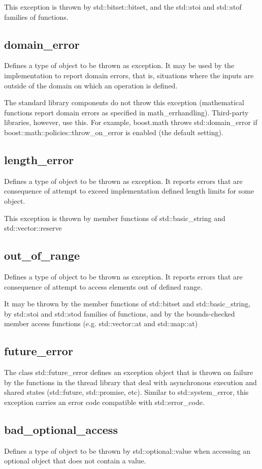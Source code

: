 \documentclass[UTF8,a4paper,12pt]{ctexbook}
\begin{document}
			This exception is thrown by std::bitset::bitset, and the std::stoi and std::stof families of functions. 
		\subsection{domain\_error}
			Defines a type of object to be thrown as exception. It may be used by the implementation to report domain errors, that is, situations where the inputs are outside of the domain on which an operation is defined.
			
			The standard library components do not throw this exception (mathematical functions report domain errors as specified in math\_errhandling). Third-party libraries, however, use this. For example, boost.math throws std::domain\_error if boost::math::policies::throw\_on\_error is enabled (the default setting). 
		\subsection{length\_error}
			Defines a type of object to be thrown as exception. It reports errors that are consequence of attempt to exceed implementation defined length limits for some object.
			
			This exception is thrown by member functions of std::basic\_string and std::vector::reserve 
		\subsection{out\_of\_range}
			Defines a type of object to be thrown as exception. It reports errors that are consequence of attempt to access elements out of defined range.
			
			It may be thrown by the member functions of std::bitset and std::basic\_string, by std::stoi and std::stod families of functions, and by the bounds-checked member access functions (e.g. std::vector::at and std::map::at) 
		\subsection{future\_error}
			The class std::future\_error defines an exception object that is thrown on failure by the functions in the thread library that deal with asynchronous execution and shared states (std::future, std::promise, etc). Similar to std::system\_error, this exception carries an error code compatible with std::error\_code. 
		\subsection{bad\_optional\_access}
			Defines a type of object to be thrown by std::optional::value when accessing an optional object that does not contain a value. 
		
\end{document}
